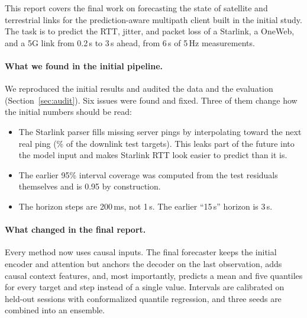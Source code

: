 This report covers the final work on forecasting the state of satellite and terrestrial links for the prediction-aware multipath client built in the initial study. The task is to predict the RTT, jitter, and packet loss of a Starlink, a OneWeb, and a 5G link from 0.2\,s to 3\,s ahead, from 6\,s of 5\,Hz measurements.

\paragraph{What we found in the initial pipeline.} We reproduced the initial results and audited the data and the evaluation (Section~\ref{sec:audit}). Six issues were found and fixed. Three of them change how the initial numbers should be read:
\begin{itemize}[leftmargin=*]
  \item The Starlink parser fills missing server pings by interpolating toward the next real ping (\InterpFracSLDL\% of the downlink test targets). This leaks part of the future into the model input and makes Starlink RTT look easier to predict than it is.
  \item The earlier 95\% interval coverage was computed from the test residuals themselves and is 0.95 by construction.
  \item The horizon steps are 200\,ms, not 1\,s. The earlier ``15\,s'' horizon is 3\,s.
\end{itemize}

\paragraph{What changed in the final report.} Every method now uses causal inputs. The final forecaster keeps the initial encoder and attention but anchors the decoder on the last observation, adds causal context features, and, most importantly, predicts a mean and five quantiles for every target and step instead of a single value. Intervals are calibrated on held-out sessions with conformalized quantile regression, and three seeds are combined into an ensemble.


